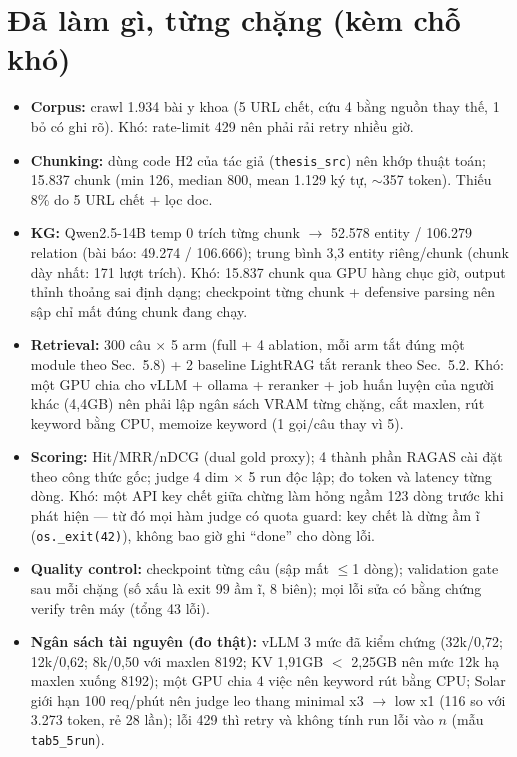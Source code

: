 \documentclass[12pt,a4paper]{article}
\begin{document}
\section{Đã làm gì, từng chặng (kèm chỗ khó)}
\begin{itemize}[leftmargin=*]
\item \textbf{Corpus:} crawl 1.934 bài y khoa (5 URL chết, cứu 4 bằng nguồn
thay thế, 1 bỏ có ghi rõ). Khó: rate-limit 429 nên phải rải retry nhiều giờ.
\item \textbf{Chunking:} dùng code H2 của tác giả (\texttt{thesis\_src}) nên
khớp thuật toán; 15.837 chunk (min 126, median 800, mean 1.129 ký tự, $\sim$357
token). Thiếu 8\% do 5 URL chết + lọc doc.
\item \textbf{KG:} Qwen2.5-14B temp 0 trích từng chunk $\rightarrow$ 52.578
entity / 106.279 relation (bài báo: 49.274 / 106.666); trung bình 3,3 entity
riêng/chunk (chunk dày nhất: 171 lượt trích). Khó: 15.837 chunk qua
GPU hàng chục giờ, output thỉnh thoảng sai định dạng; checkpoint từng chunk +
defensive parsing nên sập chỉ mất đúng chunk đang chạy.
\item \textbf{Retrieval:} 300 câu $\times$ 5 arm (full + 4 ablation, mỗi arm
tắt đúng một module theo Sec.~5.8) + 2 baseline LightRAG tắt rerank theo
Sec.~5.2. Khó: một GPU chia cho vLLM + ollama + reranker + job huấn luyện của
người khác (4,4GB) nên phải lập ngân sách VRAM từng chặng, cắt maxlen, rút
keyword bằng CPU, memoize keyword (1 gọi/câu thay vì 5).
\item \textbf{Scoring:} Hit/MRR/nDCG (dual gold proxy); 4 thành phần RAGAS cài
đặt theo công thức gốc; judge 4 dim $\times$ 5 run độc lập; đo token và latency
từng dòng. Khó: một API key chết giữa chừng làm hỏng ngầm 123 dòng trước khi
phát hiện --- từ đó mọi hàm judge có quota guard: key chết là dừng ầm ĩ
(\texttt{os.\_exit(42)}), không bao giờ ghi ``done'' cho dòng lỗi.
\item \textbf{Quality control:} checkpoint từng câu (sập mất $\le$1 dòng);
validation gate sau mỗi chặng (số xấu là exit 99 ầm ĩ, 8 biên); mọi lỗi sửa có
bằng chứng verify trên máy (tổng 43 lỗi).
\item \textbf{Ngân sách tài nguyên (đo thật):} vLLM 3 mức đã kiểm chứng
(32k/0,72; 12k/0,62; 8k/0,50 với maxlen 8192; KV 1,91GB $<$ 2,25GB nên mức 12k hạ maxlen
xuống 8192); một GPU chia 4 việc nên keyword rút bằng CPU; Solar giới hạn 100
req/phút nên judge leo thang minimal x3 $\rightarrow$ low x1 (116 so với 3.273
token, rẻ 28 lần); lỗi 429 thì retry và không tính run lỗi vào $n$ (mẫu
\texttt{tab5\_5run}).
\end{itemize}
\end{document}
